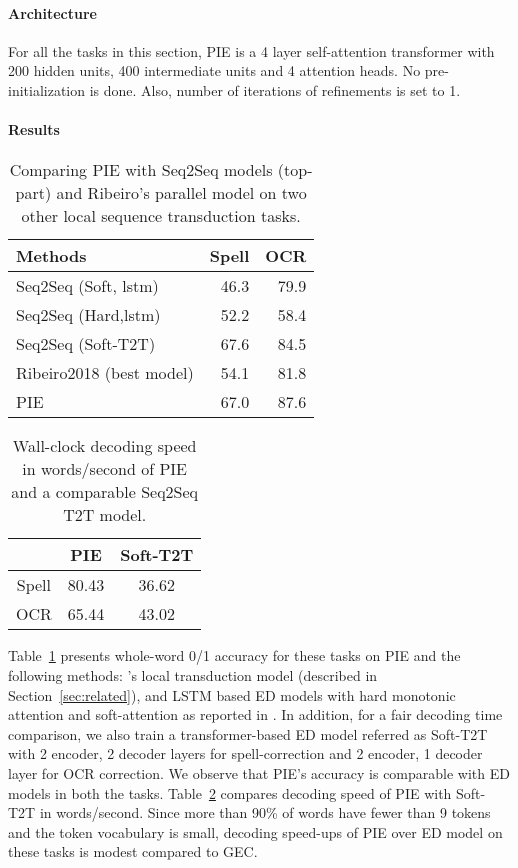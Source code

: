 \documentclass[11pt,a4paper]{article}
\begin{document}
\paragraph{Architecture}
For all the tasks in this section, PIE is a 4 layer self-attention transformer with 200 hidden units, 400 intermediate units and 4 attention heads. No  pre-initialization is done.  Also, number of iterations of refinements is set to 1.

\paragraph{Results}

\begin{table}[]
    \centering
    \begin{tabular}{|l|r|r|} \hline
         Methods & Spell & OCR \\ \hline
         Seq2Seq (Soft, lstm)& 46.3 & 79.9  \\ 
         Seq2Seq (Hard,lstm)  & 52.2 & 58.4  \\
         Seq2Seq (Soft-T2T) & 67.6 & 84.5 \\ \hline
         Ribeiro2018 (best model) & 54.1 & 81.8 \\ 
         PIE &  67.0 &  87.6 \\
        \hline
    \end{tabular}
    \caption{Comparing PIE with Seq2Seq models (top-part) and Ribeiro's parallel model on two other local sequence transduction tasks. 
    }
    \label{tab:edits}
\end{table}{}

\begin{table}[]
\centering
\begin{tabular}{|c|c|c|}
\hline
      & PIE   & Soft-T2T \\ \hline
Spell & 80.43 & 36.62     \\ \hline
OCR   & 65.44 & 43.02     \\ \hline
\end{tabular}
\caption{Wall-clock decoding speed in words/second of PIE and a comparable Seq2Seq T2T model.}
\label{tab:ng_decoding}
\end{table}

Table~\ref{tab:edits} presents whole-word 0/1 accuracy for these tasks on PIE and the following methods: \citet{Ribeiro2018}'s local transduction model (described in Section~\ref{sec:related}), and LSTM based ED models with hard monotonic attention \cite{AharoniG17} and soft-attention \cite{nmt} as reported in \cite{Ribeiro2018}. In addition, for a fair decoding time comparison, we also train a transformer-based ED model referred as Soft-T2T with 2 encoder, 2 decoder layers for spell-correction and 2 encoder, 1 decoder layer for OCR correction.
We observe that PIE's accuracy is comparable with ED models in both the tasks. Table~\ref{tab:ng_decoding} compares decoding speed of PIE with Soft-T2T in words/second.  
Since more than 90\% of words have fewer than 9 tokens and the token vocabulary  is small, decoding speed-ups of PIE over ED model on these tasks is modest compared to GEC.
\end{document}
